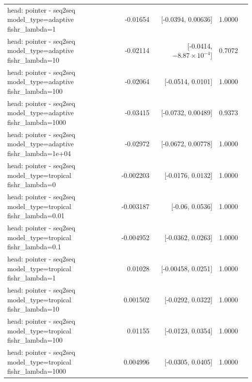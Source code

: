 \documentclass[10pt]{article}
\makeatletter
\newcommand{\stackcell}[1]{\begin{tabular}[t]{@{}l@{}}#1\end{tabular}}
\makeatother
\begin{document}
{\begin{longtable}{lrrrl}
\stackcell{head: pointer - seq2seq\\\footnotesize model\_type=adaptive fishr\_lambda=1 } & -0.01654 & [-0.0394, 0.00636] & 1.0000 & \\
\stackcell{head: pointer - seq2seq\\\footnotesize model\_type=adaptive fishr\_lambda=10 } & -0.02114 & [-0.0414, $-8.87\times10^{-4}$] & 0.7072 & \\
\stackcell{head: pointer - seq2seq\\\footnotesize model\_type=adaptive fishr\_lambda=100 } & -0.02064 & [-0.0514, 0.0101] & 1.0000 & \\
\stackcell{head: pointer - seq2seq\\\footnotesize model\_type=adaptive fishr\_lambda=1000 } & -0.03415 & [-0.0732, 0.00489] & 0.9373 & \\
\stackcell{head: pointer - seq2seq\\\footnotesize model\_type=adaptive fishr\_lambda=1e+04 } & -0.02972 & [-0.0672, 0.00778] & 1.0000 & \\
\stackcell{head: pointer - seq2seq\\\footnotesize model\_type=tropical fishr\_lambda=0 } & -0.002203 & [-0.0176, 0.0132] & 1.0000 & \\
\stackcell{head: pointer - seq2seq\\\footnotesize model\_type=tropical fishr\_lambda=0.01 } & -0.003187 & [-0.06, 0.0536] & 1.0000 & \\
\stackcell{head: pointer - seq2seq\\\footnotesize model\_type=tropical fishr\_lambda=0.1 } & -0.004952 & [-0.0362, 0.0263] & 1.0000 & \\
\stackcell{head: pointer - seq2seq\\\footnotesize model\_type=tropical fishr\_lambda=1 } & 0.01028 & [-0.00458, 0.0251] & 1.0000 & \\
\stackcell{head: pointer - seq2seq\\\footnotesize model\_type=tropical fishr\_lambda=10 } & 0.001502 & [-0.0292, 0.0322] & 1.0000 & \\
\stackcell{head: pointer - seq2seq\\\footnotesize model\_type=tropical fishr\_lambda=100 } & 0.01155 & [-0.0123, 0.0354] & 1.0000 & \\
\stackcell{head: pointer - seq2seq\\\footnotesize model\_type=tropical fishr\_lambda=1000 } & 0.004996 & [-0.0305, 0.0405] & 1.0000 & \\

\end{longtable}}
\end{document}
